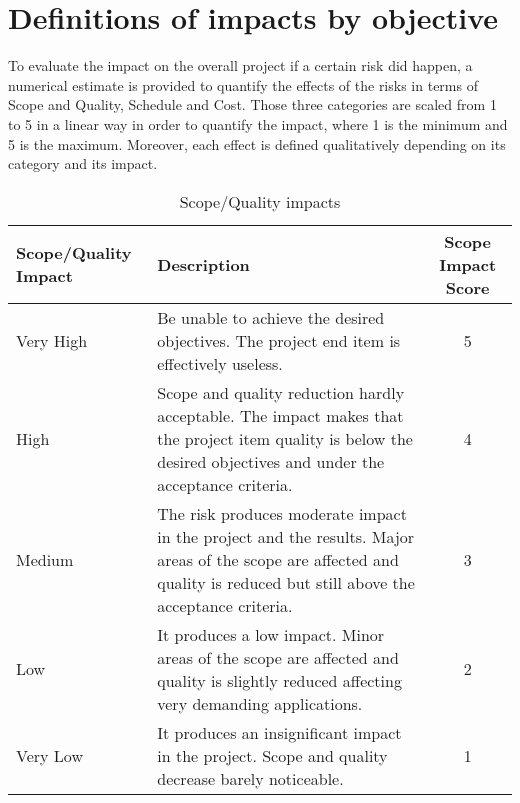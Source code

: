 \section{Definitions of impacts by objective}
\label{3.2}
To evaluate the impact on the overall project if a certain risk did happen, a numerical estimate is provided to quantify the effects of the risks in terms of Scope and Quality, Schedule and Cost. Those three categories are scaled from 1 to 5 in a linear way in order to quantify the impact, where 1 is the minimum and 5 is the maximum. Moreover, each effect is defined qualitatively depending on its category and its impact. 

\begin{table}[H]
	\centering
	\begin{tabular}{l >{\raggedright\arraybackslash}p{6.3cm} c}
		
		\toprule[2pt]
		
		\textbf{Scope/Quality Impact} &  \textbf{Description}  & \textbf{Scope Impact Score}\\
		
		\midrule [1.5pt]
		
		Very High & Be unable to achieve the desired objectives. The project end item is effectively useless. & 5\vspace{0.2cm} \\
		
		\midrule
		
		High & Scope and quality reduction hardly acceptable. The impact makes that the project item quality is below the desired objectives and under the acceptance criteria. & 4\vspace{0.2cm} \\
		
		\midrule
		
		Medium & The risk produces moderate impact in the project and the results. Major areas of the scope are affected and quality is reduced but still above the acceptance criteria. & 3\vspace{0.2cm} \\
	
		\midrule
	
		Low & It produces a low impact. Minor areas of the scope are affected and quality is slightly reduced affecting very demanding applications. & 2\vspace{0.2cm} \\
	
		\midrule
	
		Very Low & It produces an insignificant impact in the project. Scope and quality decrease barely noticeable. & 1\vspace{0.2cm} \\
			
		\bottomrule[2pt]
		
	\end{tabular}
	\caption{Scope/Quality impacts}
\end{table}
	
